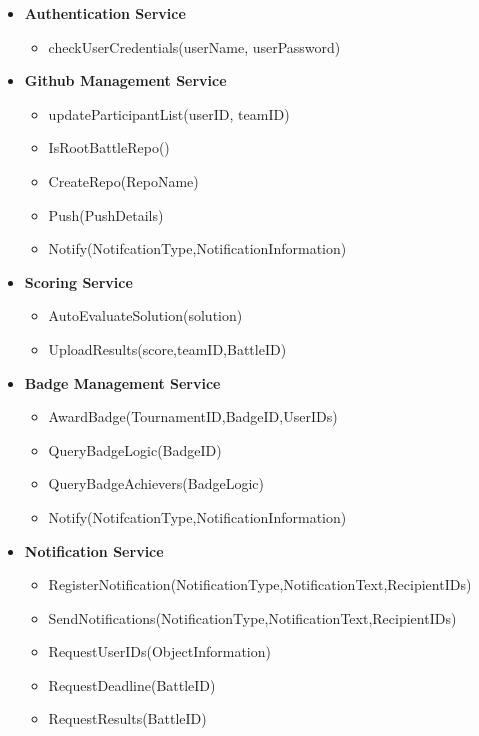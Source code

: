 \begin{itemize}
    \item \textbf{Authentication Service}
        \begin{itemize}
            \item checkUserCredentials(userName, userPassword)
        \end{itemize}
    \item \textbf{Github Management Service}
        \begin{itemize}
            \item updateParticipantList(userID, teamID)
            \item IsRootBattleRepo()
            \item CreateRepo(RepoName)
            \item Push(PushDetails)
            \item Notify(NotifcationType,NotificationInformation)
        \end{itemize}
    \item \textbf{Scoring Service}
        \begin{itemize}
            \item AutoEvaluateSolution(solution)
            \item UploadResults(score,teamID,BattleID)
        \end{itemize}
    \item \textbf{Badge Management Service}
        \begin{itemize}
            \item AwardBadge(TournamentID,BadgeID,UserIDs)
            \item QueryBadgeLogic(BadgeID)
            \item QueryBadgeAchievers(BadgeLogic)
            \item Notify(NotifcationType,NotificationInformation)
        \end{itemize}
    \item \textbf{Notification Service}
        \begin{itemize}
            \item RegisterNotification(NotificationType,NotificationText,RecipientIDs)
            \item SendNotifications(NotificationType,NotificationText,RecipientIDs)
            \item RequestUserIDs(ObjectInformation)
            \item RequestDeadline(BattleID)
            \item RequestResults(BattleID)
        \end{itemize}
\end{itemize}


